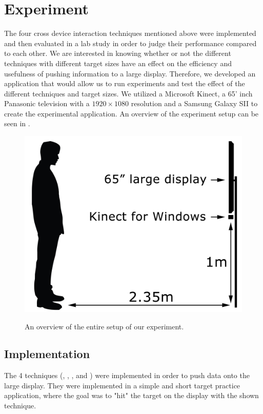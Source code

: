 \section{Experiment} \label{sec:experiment}
The four cross device interaction techniques mentioned above were implemented and then evaluated in a lab study in order to judge their performance compared to each other. 
We are interested in knowing whether or not the different techniques with different target sizes have an effect on the efficiency and usefulness of pushing information to a large display. Therefore, we developed an application that would allow us to run experiments and test the effect of the different techniques and target sizes. 
We utilized a Microsoft Kinect, a 65' inch Panasonic television with a $1920 \times 1080$ resolution and a Samsung Galaxy SII to create the experimental application. 
An overview of the experiment setup can be seen in . 

\begin{figure}[H]
	\centering
	{\includegraphics[width = 0.7\columnwidth]{images/SetupIllustration.jpg}}
	\caption{
		\protect An overview of the entire setup of our experiment.
	}
	\label{fig:entireSetup}
\end{figure}

\subsection{Implementation}

The 4 techniques (\swipe, \tilt, \throw, and \pinch) were implemented in order to push data onto the large display. 
They were implemented in a simple and short target practice application, where the goal was to "hit" the target on the display with the shown technique. 

